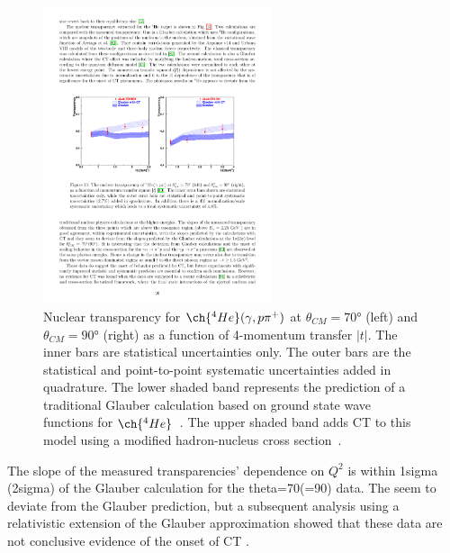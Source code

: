 \begin{figure}[!h]
    \centering
    \includegraphics[width=0.6\textwidth]{chap2/pion_photoproduction_transparency.pdf}
    \caption{Nuclear transparency for $\ch{^{4}He}(\gamma,p\pi^+)$ at
            $\theta_{CM}=\ang{70}$ (left) and $\theta_{CM}=\ang{90}$ (right) as
            a function of 4-momentum transfer $\left|t\right|$.
            The inner bars are statistical uncertainties only.
            The outer bars are the statistical and point-to-point systematic
            uncertainties added in quadrature.
            The lower shaded band represents the prediction of a traditional
            Glauber calculation based on ground state wave functions for
            $\ch{^4He}$~\cite{Arriaga_1995}.
            The upper shaded band adds CT to this model using a modified
            hadron-nucleus cross section~\cite{Farrar_1988}.
            }
    \label{fig:pion_photoproduction_transparency}
\end{figure}

The slope of the measured transparencies' dependence on $Q^2$ is within 1sigma
(2sigma) of the Glauber calculation for the theta=70(=90) data.
The seem to deviate from the Glauber prediction, but a subsequent analysis using
a relativistic extension of the Glauber approximation showed that these data are
not conclusive evidence of the onset of CT \cite{Cosyn_2006}.


